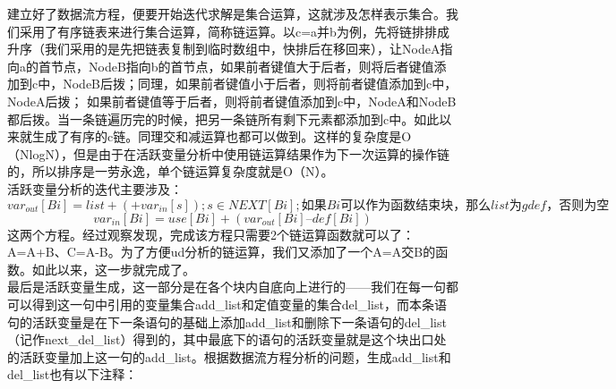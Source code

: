 \documentclass[12pt,a4paper,Flow]{report}
\begin{document}
\indent 建立好了数据流方程，便要开始迭代求解是集合运算，这就涉及怎样表示集合。我们采用了有序链表来进行集合运算，简称链运算。以c=a并b为例，先将链排排成升序（我们采用的是先把链表复制到临时数组中，快排后在移回来），让NodeA指向a的首节点，NodeB指向b的首节点，如果前者键值大于后者，则将后者键值添加到c中，NodeB后拨；同理，如果前者键值小于后者，则将前者键值添加到c中，NodeA后拨； 如果前者键值等于后者，则将前者键值添加到c中，NodeA和NodeB都后拨。当一条链遍历完的时候，把另一条链所有剩下元素都添加到c中。如此以来就生成了有序的c链。同理交和减运算也都可以做到。这样的复杂度是O（NlogN），但是由于在活跃变量分析中使用链运算结果作为下一次运算的操作链的，所以排序是一劳永逸，单个链运算复杂度就是O（N）。\\
\indent 活跃变量分析的迭代主要涉及：
\begin{displaymath}
	var_{out}[Bi] = list+(+var_{in}[s]);s\in NEXT[Bi];如果Bi可以作为函数结束块，那么list为gdef，否则为空
\end{displaymath}
\begin{displaymath}
	var_{in}[Bi] = use[Bi] + (var_{out}[Bi] – def[Bi])
\end{displaymath}
这两个方程。经过观察发现，完成该方程只需要2个链运算函数就可以了：A=A+B、C=A-B。为了方便ud分析的链运算，我们又添加了一个A=A交B的函数。如此以来，这一步就完成了。\\
最后是活跃变量生成，这一部分是在各个块内自底向上进行的——我们在每一句都可以得到这一句中引用的变量集合add\_list和定值变量的集合del\_list，而本条语句的活跃变量是在下一条语句的基础上添加add\_list和删除下一条语句的del\_list（记作next\_del\_list）得到的，其中最底下的语句的活跃变量就是这个块出口处的活跃变量加上这一句的add\_list。根据数据流方程分析的问题，生成add\_list和del\_list也有以下注释：
\end{document}
